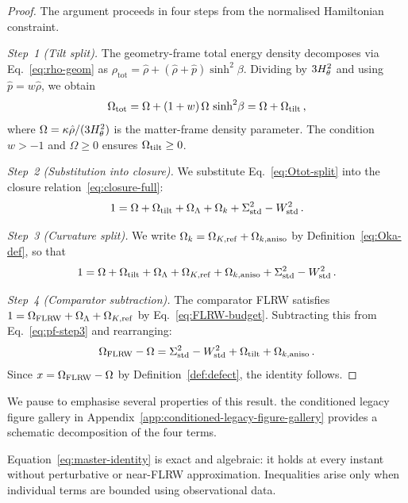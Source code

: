\begin{proof}
The argument proceeds in four steps from the normalised
Hamiltonian constraint.

\emph{Step~1 (Tilt split).}
The geometry-frame total energy density decomposes via
Eq.~\eqref{eq:rho-geom} as
$\rho_{\mathrm{tot}} = \hat{\rho}
+ (\hat{\rho} + \hat{p})\sinh^2\!\beta$.
Dividing by $3H_\theta^2$ and using
$\hat{p} = w\hat{\rho}$, we obtain
\begin{equation}\label{eq:Otot-split}
\Omega_{\mathrm{tot}}
= \Omega + (1+w)\,\Omega\,\sinh^2\!\beta
= \Omega + \Omega_{\mathrm{tilt}}\,,
\end{equation}
where $\Omega = \kappa\hat{\rho}/(3H_\theta^2)$ is the
matter-frame density parameter.  The condition $w > -1$ and
$\Omega \geq 0$ ensures $\Omega_{\mathrm{tilt}} \geq 0$.

\emph{Step~2 (Substitution into closure).}
We substitute Eq.~\eqref{eq:Otot-split} into the closure
relation~\eqref{eq:closure-full}:
\begin{equation}\label{eq:pf-step2}
1 = \Omega + \Omega_{\mathrm{tilt}} + \Omega_\Lambda + \Omega_k
  + \Sigma^2_{\mathrm{std}} - W^2_{\mathrm{std}}\,.
\end{equation}

\emph{Step~3 (Curvature split).}
We write $\Omega_k = \Omega_{K,\mathrm{ref}} + \Omega_{k,\mathrm{aniso}}$ by
Definition~\eqref{eq:Oka-def}, so that
\begin{equation}\label{eq:pf-step3}
1 = \Omega + \Omega_{\mathrm{tilt}} + \Omega_\Lambda + \Omega_{K,\mathrm{ref}} + \Omega_{k,\mathrm{aniso}}
  + \Sigma^2_{\mathrm{std}} - W^2_{\mathrm{std}}\,.
\end{equation}

\emph{Step~4 (Comparator subtraction).}
The comparator FLRW satisfies $1 = \Omega_{\mathrm{FLRW}} + \Omega_\Lambda + \Omega_{K,\mathrm{ref}}$
by Eq.~\eqref{eq:FLRW-budget}.  Subtracting this from
Eq.~\eqref{eq:pf-step3} and rearranging:
\begin{equation}
\Omega_{\mathrm{FLRW}} - \Omega
= \Sigma^2_{\mathrm{std}} - W^2_{\mathrm{std}} + \Omega_{\mathrm{tilt}} + \Omega_{k,\mathrm{aniso}}\,.
\end{equation}
Since $x = \Omega_{\mathrm{FLRW}} - \Omega$ by
Definition~\ref{def:defect}, the identity follows.
\end{proof}

We pause to emphasise several properties of this result.
the conditioned legacy figure gallery in Appendix~\ref{app:conditioned-legacy-figure-gallery} provides a schematic
decomposition of the four terms.

\begin{remark}\label{rem:identity}
Equation~\eqref{eq:master-identity} is exact and algebraic:
it holds at every instant without perturbative or near-FLRW
approximation.  Inequalities arise only when individual terms
are bounded using observational data.
\end{remark}

